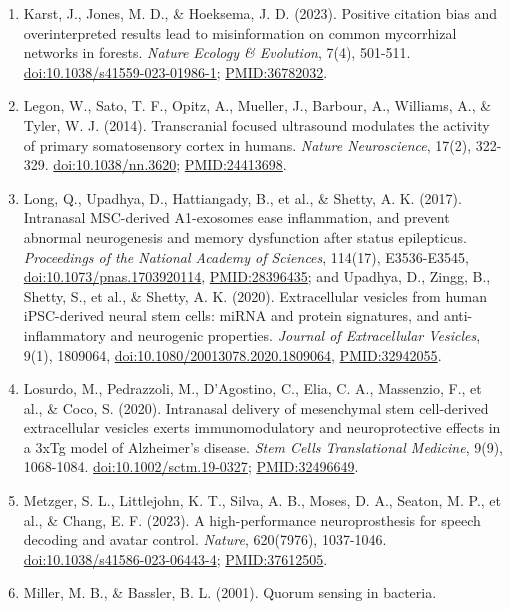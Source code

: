 \documentclass[10pt,letterpaper]{article}
\begin{document}
\begin{enumerate}
  \url{PMID:25372285}.
\item
  Karst, J., Jones, M. D., \& Hoeksema, J. D. (2023). Positive citation
  bias and overinterpreted results lead to misinformation on common
  mycorrhizal networks in forests. \emph{Nature Ecology \& Evolution},
  7(4), 501-511.
  \href{https://doi.org/10.1038/s41559-023-01986-1}{doi:10.1038/s41559-023-01986-1};
  \url{PMID:36782032}.
\item
  Legon, W., Sato, T. F., Opitz, A., Mueller, J., Barbour, A., Williams,
  A., \& Tyler, W. J. (2014). Transcranial focused ultrasound modulates
  the activity of primary somatosensory cortex in humans. \emph{Nature
  Neuroscience}, 17(2), 322-329.
  \href{https://doi.org/10.1038/nn.3620}{doi:10.1038/nn.3620};
  \url{PMID:24413698}.
\item
  Long, Q., Upadhya, D., Hattiangady, B., et al., \& Shetty, A. K.
  (2017). Intranasal MSC-derived A1-exosomes ease inflammation, and
  prevent abnormal neurogenesis and memory dysfunction after status
  epilepticus. \emph{Proceedings of the National Academy of Sciences},
  114(17), E3536-E3545,
  \href{https://doi.org/10.1073/pnas.1703920114}{doi:10.1073/pnas.1703920114},
  \url{PMID:28396435}; and Upadhya, D., Zingg, B., Shetty, S., et al.,
  \& Shetty, A. K. (2020). Extracellular vesicles from human
  iPSC-derived neural stem cells: miRNA and protein signatures, and
  anti-inflammatory and neurogenic properties. \emph{Journal of
  Extracellular Vesicles}, 9(1), 1809064,
  \href{https://doi.org/10.1080/20013078.2020.1809064}{doi:10.1080/20013078.2020.1809064},
  \url{PMID:32942055}.
\item
  Losurdo, M., Pedrazzoli, M., D'Agostino, C., Elia, C. A., Massenzio,
  F., et al., \& Coco, S. (2020). Intranasal delivery of mesenchymal
  stem cell-derived extracellular vesicles exerts immunomodulatory and
  neuroprotective effects in a 3xTg model of Alzheimer's disease.
  \emph{Stem Cells Translational Medicine}, 9(9), 1068-1084.
  \href{https://doi.org/10.1002/sctm.19-0327}{doi:10.1002/sctm.19-0327};
  \url{PMID:32496649}.
\item
  Metzger, S. L., Littlejohn, K. T., Silva, A. B., Moses, D. A., Seaton,
  M. P., et al., \& Chang, E. F. (2023). A high-performance
  neuroprosthesis for speech decoding and avatar control. \emph{Nature},
  620(7976), 1037-1046.
  \href{https://doi.org/10.1038/s41586-023-06443-4}{doi:10.1038/s41586-023-06443-4};
  \url{PMID:37612505}.
\item
  Miller, M. B., \& Bassler, B. L. (2001). Quorum sensing in bacteria.

\end{enumerate}
\end{document}
